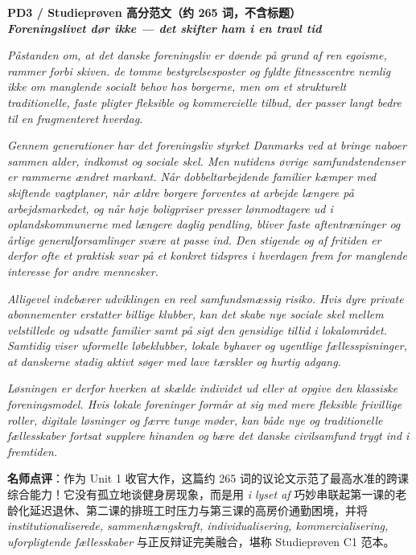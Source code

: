 \begin{answerbox}
\textbf{PD3 / Studieprøven 高分范文（约 265 词，不含标题）}\\
\textit{\textbf{Foreningslivet dør ikke --- det skifter ham i en travl tid}}

\textit{Påstanden om, at det danske foreningsliv er døende på grund af ren egoisme, rammer forbi skiven.  de tomme bestyrelsesposter og fyldte fitnesscentre nemlig ikke om manglende socialt behov hos borgerne, men om et strukturelt  traditionelle, faste pligter  fleksible og kommercielle tilbud, der passer langt bedre til en fragmenteret hverdag.}

\textit{Gennem generationer har det  foreningsliv styrket Danmarks  ved at bringe naboer sammen  alder, indkomst og sociale skel. Men  nutidens øvrige samfundstendenser er rammerne ændret markant. Når dobbeltarbejdende familier kæmper med skiftende vagtplaner, når ældre borgere forventes at arbejde længere på arbejdsmarkedet, og når høje boligpriser presser lønmodtagere ud i oplandskommunerne med længere daglig pendling, bliver faste aftentræninger og årlige generalforsamlinger svære at passe ind. Den stigende  og  af fritiden er derfor ofte et praktisk svar på et konkret tidspres i hverdagen frem for manglende interesse for andre mennesker.}

\textit{Alligevel indebærer udviklingen en reel samfundsmæssig risiko. Hvis dyre private abonnementer erstatter billige klubber, kan det skabe nye sociale skel mellem velstillede og udsatte familier samt på sigt  den gensidige tillid i lokalområdet. Samtidig viser uformelle løbeklubber, lokale byhaver og ugentlige fællesspisninger, at danskerne stadig aktivt søger  med lave tærskler og hurtig adgang.}

\textit{Løsningen er derfor hverken at skælde individet ud eller at opgive den klassiske foreningsmodel. Hvis lokale foreninger formår at  sig med mere fleksible frivillige roller, digitale løsninger og færre tunge møder, kan både nye og traditionelle fællesskaber fortsat supplere hinanden og bære det danske civilsamfund trygt ind i fremtiden.}

\small\textbf{名师点评}：作为 Unit 1 收官大作，这篇约 265 词的议论文示范了最高水准的跨课综合能力！它没有孤立地谈健身房现象，而是用 \textit{i lyset af} 巧妙串联起第一课的老龄化延迟退休、第二课的排班工时压力与第三课的高房价通勤困境，并将 \textit{institutionaliserede, sammenhængskraft, individualisering, kommercialisering, uforpligtende fællesskaber} 与正反辩证完美融合，堪称 Studieprøven C1 范本。
\end{answerbox}
